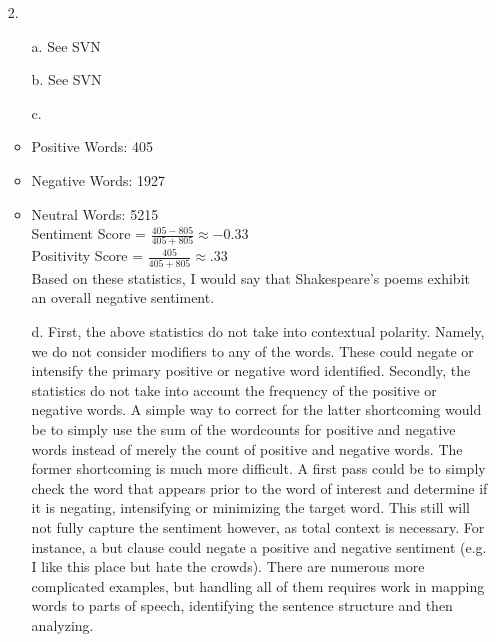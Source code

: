 \documentclass{article}
\begin{document}
\begin{itemize}
\item[2.]
	\begin{itemize}
	\item[a.] See SVN
	\item[b.] See SVN
	\item[c.] 
		\item Positive Words: 405
		\item Negative Words: 1927
		\item Neutral Words: 5215\\	
		Sentiment Score = $\frac{405-805}{405+805} \approx -0.33$ \\
		Positivity Score = $\frac{405}{405+805} \approx .33$ \\
		Based on these statistics, I would say that Shakespeare's poems exhibit an overall negative sentiment.
	\item[d.] First, the above statistics do not take into contextual polarity. Namely, we do not consider modifiers to any of the words. These could negate or intensify the primary positive or negative word identified. Secondly, the statistics do not take into account the frequency of the positive or negative words. A simple way to correct for the latter shortcoming would be to simply use the sum of the wordcounts for positive and negative words instead of merely the count of positive and negative words. The former shortcoming is much more difficult. A first pass could be to simply check the word that appears prior to the word of interest and determine if it is negating, intensifying or minimizing the target word. This still will not fully capture the sentiment however, as total context is necessary. For instance, a but clause could negate a positive and negative sentiment (e.g. I like this place but hate the crowds). There are numerous more complicated examples, but handling all of them requires work in mapping words to parts of speech, identifying the sentence structure and then analyzing.
	
	\end{itemize}		
	
\end{itemize}
\end{document}
